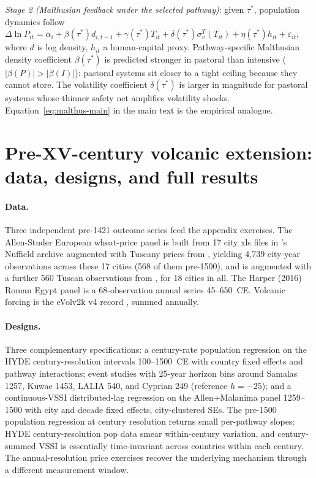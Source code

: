 \documentclass[11pt,letterpaper]{article}
\begin{document}
\emph{Stage 2 (Malthusian feedback under the selected pathway)}: given $\tau^\ast$, population dynamics follow $\Delta \ln P_{it} = \alpha_i + \beta(\tau^\ast) d_{i,t-1} + \gamma(\tau^\ast) T_{it} + \delta(\tau^\ast) \sigma_v^T(T_{it}) + \eta(\tau^\ast) h_{it} + \varepsilon_{it}$, where $d$ is log density, $h_{it}$ a human-capital proxy. Pathway-specific Malthusian density coefficient $\beta(\tau^\ast)$ is predicted stronger in pastoral than intensive ($|\beta(P)| > |\beta(I)|$): pastoral systems sit closer to a tight ceiling because they cannot store. The volatility coefficient $\delta(\tau^\ast)$ is larger in magnitude for pastoral systems whose thinner safety net amplifies volatility shocks. Equation~\ref{eq:malthus-main} in the main text is the empirical analogue.

\section{Pre-XV-century volcanic extension: data, designs, and full results}
\label{app:volcanic-pre1500}

\paragraph{Data.} Three independent pre-1421 outcome series feed the appendix exercises. The Allen-Studer European wheat-price panel is built from 17 city xls files in \citet{allen2001divergence}'s Nuffield archive augmented with Tuscany prices from \citet{malanima2002}, yielding 4{,}739 city-year observations across these 17 cities (568 of them pre-1500), and is augmented with a further 560 Tuscan observations from \citet{malanima2002}, for 18 cities in all. The Harper (2016) Roman Egypt panel \citep{harper2016people} is a 68-observation annual series 45--650~CE. Volcanic forcing is the eVolv2k v4 record \citep{sigl2024evolv2k}, summed annually.

\paragraph{Designs.} Three complementary specifications: a century-rate population regression on the HYDE century-resolution intervals 100--1500~CE with country fixed effects and pathway interactions; event studies with 25-year horizon bins around Samalas 1257, Kuwae 1453, LALIA 540, and Cyprian 249 (reference $h=-25$); and a continuous-VSSI distributed-lag regression on the Allen+Malanima panel 1259--1500 with city and decade fixed effects, city-clustered SEs. The pre-1500 population regression at century resolution returns small per-pathway slopes: HYDE century-resolution pop data smear within-century variation, and century-summed VSSI is essentially time-invariant across countries within each century. The annual-resolution price exercises recover the underlying mechanism through a different measurement window.
\end{document}
